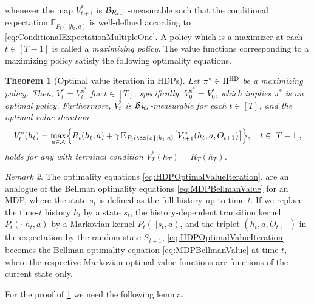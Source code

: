 \documentclass[
    a4paper,
    11pt,
    bibliography=totoc,
    listof=totoc,      
    headinclude=true,
    cleardoublepage=empty,
]{scrbook}
\theoremstyle{plain}
\newtheorem{theorem}{Theorem}[chapter]
\theoremstyle{definition}
\theoremstyle{remark}
\newtheorem{remark}[theorem]{Remark}
\newcommand{\SetR}{\mathbb R}
\newcommand{\E}{\mathbb E}
\newcommand{\SpaceA}{{\cal A}}
\newcommand{\SpaceH}{{\cal H}}
\begin{document}
whenever the map $V^*_{t+1}$ is $\mathcal{B}_{\SpaceH_{t+1}}$-measurable such 
that the conditional expectation $\E_{P_t(\cdot|h_t,a)}$ is well-defined 
according to \cref{eq:ConditionalExpectationMultipleOne}. A policy
which is a maximizer at each $t\in[T-1]$ is called a \textit{maximizing
policy}. The value functions corresponding to a maximizing policy satisfy the following optimality equations.
\begin{theorem}[Optimal value iteration in HDPs]
\label{thm:HDPOptimalValueIteration}
    Let $\pi^*\in\Pi^\text{\normalfont{HD}}$ be a maximizing policy. Then,
    $V^*_t = V^{\pi^*}_t$ for $t\in[T]$, specifically, $V^{\pi^*}_0 = V^*_0$, 
    which implies $\pi^*$ is an optimal policy. Furthermore, $V_t^*$ is 
    $\mathcal{B}_{\SpaceH_t}$-measurable for each $t\in[T]$, and the 
    \textit{optimal value iteration}
    \begin{equation}
    \label{eq:HDPOptimalValueIteration}
        V^*_t(h_t)
        =
        \max_{a\in\SpaceA} \Bigl\{
            R_t(h_t,a) + \gamma \,
            \E_{P_t(\dd{o}|h_t,a)} \bigl[ V^*_{t+1}(h_t, a, O_{t+1}) \bigr]
        \Bigr\},
        \quad t\in[T-1],
    \end{equation}
    holds for any with terminal condition $V^*_T(h_T) = R_T(h_T)$.
\end{theorem}
\begin{remark}
    The optimality equations \eqref{eq:HDPOptimalValueIteration}, are an 
    analogue of the Bellman optimality equations 
    \eqref{eq:MDPBellmanValue} for an MDP, where the state $s_t$ is 
    defined as the full history up to time $t$. If we replace the time-$t$ 
    history $h_t$ by a state $s_t$, the history-dependent transition 
    kernel $P_t(\cdot | h_t,a)$ by a Markovian kernel $P_t(\cdot |
    s_t,a)$, and the triplet $(h_t,a, O_{t+1})$ in the expectation by the 
    random state $S_{t+1}$, \cref{eq:HDPOptimalValueIteration} becomes the 
    Bellman optimality equation \eqref{eq:MDPBellmanValue} at time $t$, 
    where the respective Markovian optimal value functions are functions 
    of the current state only.
\end{remark}
For the proof of \cref{thm:HDPOptimalValueIteration} we need the following
lemma.

\end{document}

